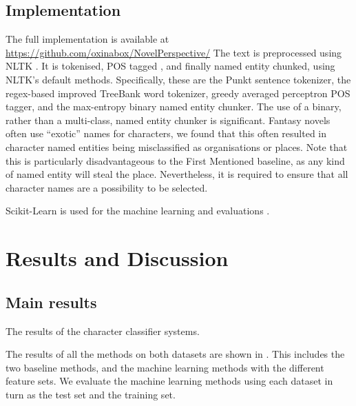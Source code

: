 \documentclass[11pt,a4paper]{article}
\newcommand{\parencite}{\citep}
\begin{document}
\subsection{Implementation}
The full implementation is available at \url{https://github.com/oxinabox/NovelPerspective/}
The text is preprocessed using NLTK \parencite{NLTK}.
It is tokenised, POS tagged , and finally named entity chunked, using NLTK's default methods.
Specifically, these are the Punkt sentence tokenizer, the regex-based improved TreeBank word tokenizer, greedy averaged perceptron POS tagger, and the max-entropy binary named entity chunker.
The use of a binary, rather than a multi-class, named entity chunker is significant.
Fantasy novels often use ``exotic'' names for characters, we found that this often resulted in character named entities being misclassified as organisations or places.
Note that this is particularly disadvantageous to the First Mentioned baseline, as any kind of named entity will steal the place.
Nevertheless, it is required to ensure that all character names are a possibility to be selected.

Scikit-Learn is used for the machine learning and evaluations \parencite{scikit-learn}.

\section{Results and Discussion}\label{sec:results-and-discussion}

\subsection{Main results}

\begin{table}
	\begin{adjustbox}{max width=\columnwidth}
	\end{adjustbox}
	
	\caption{The results of the character classifier systems.} \label{tbl:resmain}
\end{table}

The results of all the methods on both datasets are shown in .
This includes the two baseline methods, and the machine learning methods with the different feature sets.
We evaluate the machine learning methods using each dataset in turn as the test set and the training set.
\end{document}
